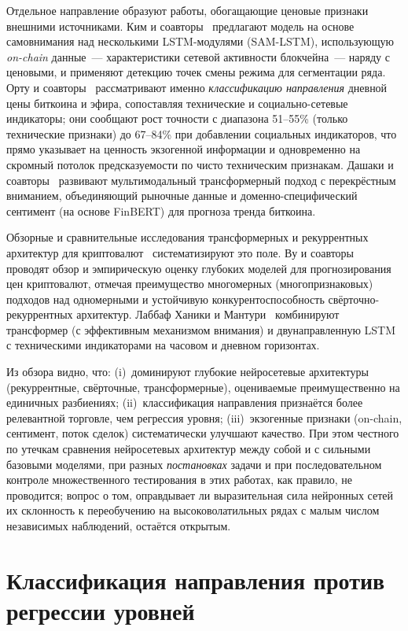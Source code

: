 \documentclass[12pt,a4paper]{report}
\begin{document}
Отдельное направление образуют работы, обогащающие ценовые признаки внешними
источниками. Ким и соавторы~\cite{kim2022} предлагают модель на основе
самовнимания над несколькими LSTM-модулями (SAM-LSTM), использующую \emph{on-chain}
данные~--- характеристики сетевой активности блокчейна~--- наряду с ценовыми, и
применяют детекцию точек смены режима для сегментации ряда. Орту и
соавторы~\cite{ortu2022} рассматривают именно \emph{классификацию направления}
дневной цены биткоина и эфира, сопоставляя технические и социально-сетевые
индикаторы; они сообщают рост точности с диапазона 51--55\% (только технические
признаки) до 67--84\% при добавлении социальных индикаторов, что прямо указывает на
ценность экзогенной информации и одновременно на скромный потолок предсказуемости
по чисто техническим признакам. Дашаки и соавторы~\cite{dashtaki2025} развивают
мультимодальный трансформерный подход с перекрёстным вниманием, объединяющий
рыночные данные и доменно-специфический сентимент (на основе FinBERT) для прогноза
тренда биткоина.

Обзорные и сравнительные исследования трансформерных и рекуррентных архитектур для
криптовалют~\cite{wu2024, labbaf2024} систематизируют это поле. Ву и
соавторы~\cite{wu2024} проводят обзор и эмпирическую оценку глубоких моделей для
прогнозирования цен криптовалют, отмечая преимущество многомерных
(многопризнаковых) подходов над одномерными и устойчивую конкурентоспособность
свёрточно-рекуррентных архитектур. Лаббаф Ханики и Мантури~\cite{labbaf2024}
комбинируют трансформер (с эффективным механизмом внимания) и двунаправленную
LSTM с техническими индикаторами на часовом и дневном горизонтах.

Из обзора видно, что: (i)~доминируют глубокие нейросетевые архитектуры
(рекуррентные, свёрточные, трансформерные), оцениваемые преимущественно на
единичных разбиениях; (ii)~классификация направления признаётся более релевантной
торговле, чем регрессия уровня; (iii)~экзогенные признаки (on-chain, сентимент,
поток сделок) систематически улучшают качество. При этом честного по утечкам
сравнения нейросетевых архитектур между собой и с сильными базовыми моделями, при
разных \emph{постановках} задачи и при последовательном контроле множественного
тестирования в этих работах, как правило, не проводится; вопрос о том, оправдывает
ли выразительная сила нейронных сетей их склонность к переобучению на
высоковолатильных рядах с малым числом независимых наблюдений, остаётся открытым.

\section{Классификация направления против регрессии уровней}
\end{document}
